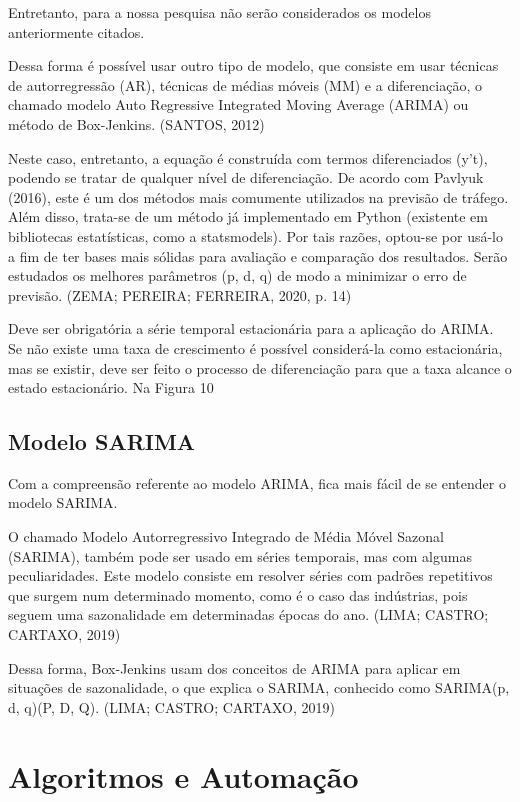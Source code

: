 \documentclass[
	12pt,				%
	openright,			%
	twoside,			%
	a4paper,			%
	english,			%
	french,				%
	spanish,			%
	brazil				%
	]{abntex2}
\begin{document}
Entretanto, para a nossa pesquisa não serão considerados os modelos anteriormente citados.

Dessa forma é possível usar outro tipo de modelo, que consiste em usar técnicas de autorregressão (AR), técnicas de médias móveis (MM) e a diferenciação, o chamado modelo Auto Regressive Integrated Moving Average (ARIMA) ou método de Box-Jenkins. (SANTOS, 2012)

Neste caso, entretanto, a equação é construída com termos diferenciados (y’t), podendo se tratar de qualquer nível de diferenciação. De acordo com Pavlyuk (2016), este é um dos métodos mais comumente utilizados na previsão de tráfego. Além disso, trata-se de um método já implementado em Python (existente em bibliotecas estatísticas, como a statsmodels). Por tais razões, optou-se por usá-lo a fim de ter bases mais sólidas para avaliação e comparação dos resultados. Serão estudados os melhores parâmetros (p, d, q) de modo a minimizar o erro de previsão. (ZEMA; PEREIRA; FERREIRA, 2020, p. 14)

Deve ser obrigatória a série temporal estacionária para a aplicação do ARIMA. Se não existe uma taxa de crescimento é possível considerá-la como estacionária, mas se existir, deve ser feito o processo de diferenciação para que a taxa alcance o estado estacionário. Na Figura 10 

\subsection{Modelo SARIMA}

Com a compreensão referente ao modelo ARIMA, fica mais fácil de se entender o modelo SARIMA. 

O chamado Modelo Autorregressivo Integrado de Média Móvel Sazonal (SARIMA), também pode ser usado em séries temporais, mas com algumas peculiaridades. Este modelo consiste em resolver séries com padrões repetitivos que surgem num determinado momento, como é o caso das indústrias, pois seguem uma sazonalidade em determinadas épocas do ano. (LIMA; CASTRO; CARTAXO, 2019)

Dessa forma, Box-Jenkins usam dos conceitos de ARIMA para aplicar em situações de sazonalidade, o que explica o SARIMA, conhecido como SARIMA(p, d, q)(P, D, Q). (LIMA; CASTRO; CARTAXO, 2019)

\section{Algoritmos e Automação}
\end{document}
